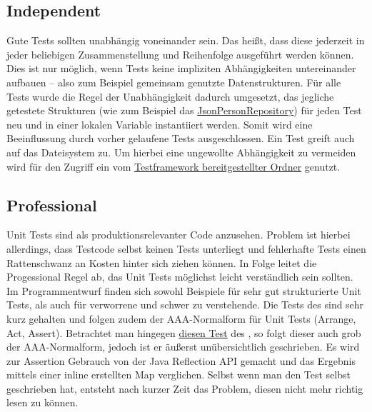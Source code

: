 \subsection{Independent}
Gute Tests sollten unabhängig voneinander sein.
Das heißt, dass diese jederzeit in jeder beliebigen Zusammenstellung und Reihenfolge ausgeführt werden können.
Dies ist nur möglich, wenn Tests keine impliziten Abhängigkeiten untereinander aufbauen -- also zum Beispiel gemeinsam genutzte Datenstrukturen.
Für alle Tests wurde die Regel der Unabhängigkeit dadurch umgesetzt, das jegliche getestete Strukturen (wie zum Beispiel das \href{https://github.com/yschiebelhut/carpool-java/blob/6d938e78763ca42270aafb8f51de4104c88e558a/0-carpool-java-plugin-json/src/test/java/speicher/JsonPersonRepositoryTest.java}{JsonPersonRepository}) für jeden Test neu und in einer lokalen Variable instantiiert werden.
Somit wird eine Beeinflussung durch vorher gelaufene Tests ausgeschlossen.
Ein Test greift auch auf das Dateisystem zu.
Um hierbei eine ungewollte Abhängigkeit zu vermeiden wird für den Zugriff ein vom \href{https://github.com/yschiebelhut/carpool-java/blob/6d938e78763ca42270aafb8f51de4104c88e558a/0-carpool-java-plugin-json/src/test/java/speicher/JsonPersonRepositoryTest.java#L142}{Testframework bereitgestellter Ordner} genutzt.

\subsection{Professional}
Unit Tests sind als produktionsrelevanter Code anzusehen.
Problem ist hierbei allerdings, dass Testcode selbst keinen Tests unterliegt und fehlerhafte Tests einen Rattenschwanz an Kosten hinter sich ziehen können.
In Folge leitet die Progessional Regel ab, das Unit Tests möglichst leicht verständlich sein sollten.
Im Programmentwurf finden sich sowohl Beispiele für sehr gut strukturierte Unit Tests, als auch für verworrene und schwer zu verstehende.
Die Tests des \href{https://github.com/yschiebelhut/carpool-java/blob/6d938e78763ca42270aafb8f51de4104c88e558a/0-carpool-java-integration/src/test/java/paypal/PayPalLinkBuilderTest.java}{} sind sehr kurz gehalten und folgen zudem der AAA-Normalform für Unit Tests (Arrange, Act, Assert).
Betrachtet man hingegen \href{https://github.com/yschiebelhut/carpool-java/blob/6d938e78763ca42270aafb8f51de4104c88e558a/0-carpool-java-plugin-json/src/test/java/speicher/JsonFahrgemeinschaftRepositoryTest.java#L26}{diesen Test} des , so folgt dieser auch grob der AAA-Normalform, jedoch ist er äußerst unübersichtlich geschrieben.
Es wird zur Assertion Gebrauch von der Java Reflection API gemacht und das Ergebnis mittels einer inline erstellten Map verglichen.
Selbst wenn man den Test selbst geschrieben hat, entsteht nach kurzer Zeit das Problem, diesen nicht mehr richtig lesen zu können.

